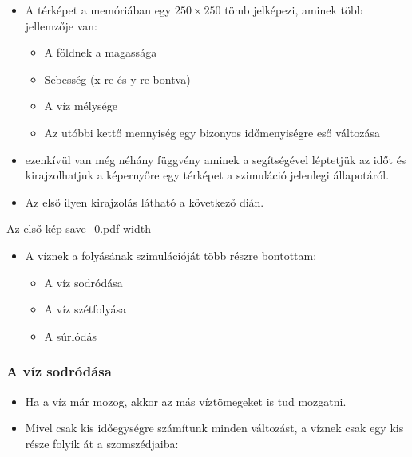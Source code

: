 \documentclass{beamer}
\begin{document}
	\begin{frame}
		\begin{itemize}
			\item A térképet a memóriában egy $250 \times 250$ tömb jelképezi, aminek több jellemzője van:

			
			\begin{itemize}
				\item A földnek a magassága
			
				\item Sebesség (x-re és y-re bontva)
			
				\item A víz mélysége
			
				\item Az utóbbi kettő mennyiség egy bizonyos időmenyiségre eső változása
			
			\end{itemize}
			\item ezenkívül van még néhány függvény aminek a segítségével léptetjük az időt és kirajzolhatjuk a képernyőre egy térképet a szimuláció jelenlegi állapotáról.
			
			\item Az első ilyen kirajzolás látható a következő dián.
		\end{itemize}
	\end{frame}
	\begin{frame}
		Az első kép
		\XeTeXpdffile save_0.pdf width \textwidth
	\end{frame}
	\begin{frame}
		\begin{itemize}
			\item A víznek a folyásának szimulációját több részre bontottam:
			
			\begin{itemize}
				\item A víz sodródása
				
				\item A víz szétfolyása
				
				\item A súrlódás
			\end{itemize}
		\end{itemize}
	\end{frame}
	\begin{frame}
		\frametitle{A víz sodródása}
		\begin{itemize}
			\item Ha a víz már mozog, akkor az más víztömegeket is tud mozgatni.
			
			\item Mivel csak kis időegységre számítunk minden változást, a víznek csak egy kis része folyik át a szomszédjaiba:
		\end{itemize}
	\end{frame}
\end{document}
